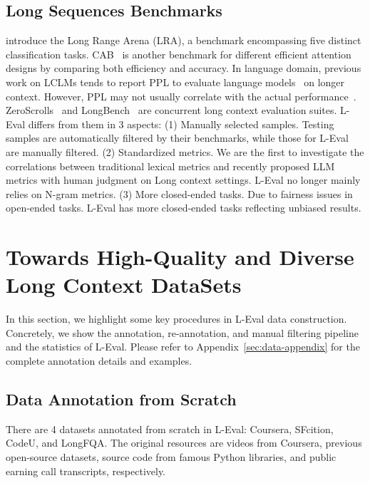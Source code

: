 \subsection{Long Sequences Benchmarks}
\cite{tay2020long} introduce the Long Range Arena (LRA), a benchmark encompassing five distinct classification tasks. CAB~\citep{zhang2023cab} is another benchmark for different efficient attention designs by comparing both efficiency and accuracy. In language domain, 
previous work on LCLMs tends to report PPL to evaluate language models~\citep{su2022roformer, peng2023yarn} on longer context. However, PPL may not usually correlate with the actual performance~\citep{sun2021long}.  ZeroScrolls~\citep{shaham2022scrolls, shaham2023zeroscrolls} and LongBench~\citep{bai2023longbench} are concurrent long context evaluation suites. L-Eval differs from them in 3 aspects: (1) Manually selected samples. Testing samples are automatically filtered by their benchmarks, while those for L-Eval are manually filtered. (2) Standardized metrics.  We are the first to investigate the correlations between traditional lexical metrics and recently proposed LLM metrics with human judgment on Long context settings. L-Eval no longer mainly relies on N-gram metrics.  (3) More closed-ended tasks. Due to fairness issues in open-ended tasks. L-Eval has more closed-ended tasks reflecting unbiased results.

\section{Towards High-Quality and Diverse Long Context DataSets}
\label{sec:data}
In this section, we highlight some key procedures in L-Eval data construction.
Concretely, we show the annotation, re-annotation, and manual filtering pipeline and the statistics of L-Eval.  Please refer to Appendix~\ref{sec:data-appendix} for the complete annotation details and examples. 

\subsection{Data Annotation from Scratch}\label{sec:scratch}
There are 4 datasets annotated from scratch in L-Eval: Coursera, SFcition, CodeU, and LongFQA. The original resources are videos from Coursera, previous open-source datasets, source code from famous Python libraries, and public earning call transcripts, respectively.

\vspace{-0.7em}
